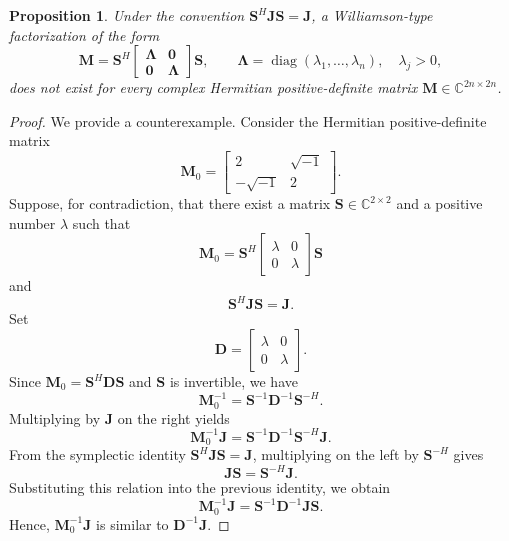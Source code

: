 \documentclass[pdflatex,sn-mathphys-ay]{sn-jnl}
\newcommand{\M}[1]{\bm{#1}}     %
\newcommand{\C}{\mathbb{C}}         %
\newcommand{\diag}{\operatorname{diag}}
\theoremstyle{thmstyleone}
\newtheorem{proposition}[theorem]{Proposition}
\theoremstyle{thmstyletwo}
\theoremstyle{thmstylethree}
\numberwithin{equation}{section}
\begin{document}
\begin{proposition}
\label{prop:complex_obstruction}
Under the convention $\M{S}^H \M{J}\M{S} = \M{J}$, a Williamson-type factorization of the form
$$
\M{M} = \M{S}^H
\begin{bmatrix}
\M{\Lambda} & \M{0} \\
\M{0} & \M{\Lambda}
\end{bmatrix}
\M{S},
\qquad
\M{\Lambda} = \diag(\lambda_1,\dots,\lambda_n), \quad \lambda_j > 0,
$$
does not exist for every complex Hermitian positive-definite matrix $\M{M} \in \C^{2n \times 2n}$.
\end{proposition}
\begin{proof}
We provide a counterexample. Consider the Hermitian positive-definite matrix
$$
\M{M}_0 =
\begin{bmatrix}
2 & \sqrt{-1} \\
-\sqrt{-1} & 2
\end{bmatrix}.
$$
Suppose, for contradiction, that there exist a matrix $\M{S} \in \C^{2 \times 2}$ and a positive number $\lambda$ such that
\begin{equation}\label{eq:M0_decomposition}
\M{M}_0 = \M{S}^H
\begin{bmatrix}
\lambda & 0 \\
0 & \lambda
\end{bmatrix}
\M{S}
\end{equation}
and
$$
\M{S}^H \M{J}\M{S} = \M{J}.
$$
Set
$$
\M{D} =
\begin{bmatrix}
\lambda & 0 \\
0 & \lambda
\end{bmatrix}.
$$
Since $\M{M}_0 = \M{S}^H \M{D}\M{S}$ and $\M{S}$ is invertible, we have
$$
\M{M}_0^{-1} = \M{S}^{-1}\M{D}^{-1}\M{S}^{-H}.
$$
Multiplying by $\M{J}$ on the right yields
$$
\M{M}_0^{-1}\M{J} = \M{S}^{-1}\M{D}^{-1}\M{S}^{-H}\M{J}.
$$
From the symplectic identity $\M{S}^H \M{J}\M{S} = \M{J}$, multiplying on the left by $\M{S}^{-H}$ gives
$$
\M{J}\M{S} = \M{S}^{-H}\M{J}.
$$
Substituting this relation into the previous identity, we obtain
$$
\M{M}_0^{-1}\M{J} = \M{S}^{-1}\M{D}^{-1}\M{J}\M{S}.
$$
Hence, $\M{M}_0^{-1}\M{J}$ is similar to $\M{D}^{-1}\M{J}$.


\end{proof}
\end{document}
